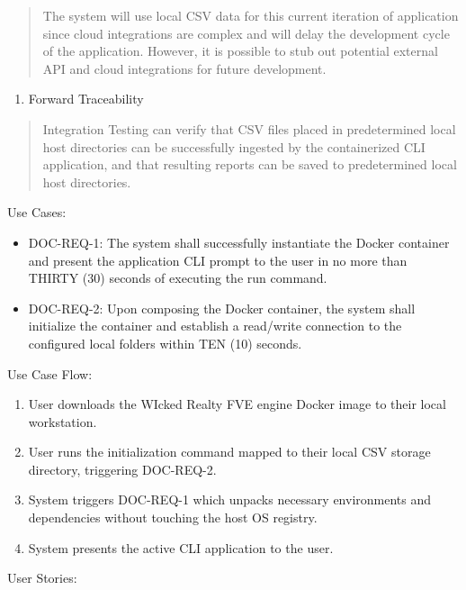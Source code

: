 \documentclass[
]{article}
\begin{document}
\begin{quote}
The system will use local CSV data for this current iteration of
application since cloud integrations are complex and will delay the
development cycle of the application. However, it is possible to stub
out potential external API and cloud integrations for future
development.
\end{quote}

\begin{enumerate}
\def\labelenumi{\alph{enumi}.}
\item
  Forward Traceability
\end{enumerate}

\begin{quote}
Integration Testing can verify that CSV files placed in predetermined
local host directories can be successfully ingested by the containerized
CLI application, and that resulting reports can be saved to
predetermined local host directories.
\end{quote}

Use Cases:

\begin{itemize}
\item
  DOC-REQ-1: The system shall successfully instantiate the Docker
  container and present the application CLI prompt to the user in no
  more than THIRTY (30) seconds of executing the run command.
\item
  DOC-REQ-2: Upon composing the Docker container, the system shall
  initialize the container and establish a read/write connection to the
  configured local folders within TEN (10) seconds.
\end{itemize}

Use Case Flow:

\begin{enumerate}
\def\labelenumi{\arabic{enumi}.}
\item
  User downloads the WIcked Realty FVE engine Docker image to their
  local workstation.
\item
  User runs the initialization command mapped to their local CSV storage
  directory, triggering DOC-REQ-2.
\item
  System triggers DOC-REQ-1 which unpacks necessary environments and
  dependencies without touching the host OS registry.
\item
  System presents the active CLI application to the user.
\end{enumerate}

User Stories:
\end{document}
